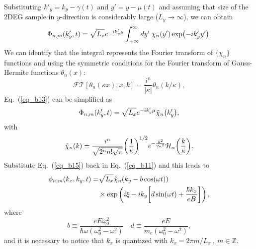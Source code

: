 Substituting $  {k'_y} = k_y -\gamma(t)$ and $y' = y -\mu(t)$ and assuming that size of the 2DEG sample in $y$-direction is considerably large ($L_y \rightarrow \infty$), we can obtain
\begin{equation} \label{eq_b13}
  \Phi_{n,m}({k'_y} ,t) =
  {\sqrt{L_x}} e^{-i {k'_y}\mu}
  \int_{-\infty}^{\infty} dy'\;
  \chi_{n}\qty(y')
  \exp(-i{k'_y} y').
\end{equation}
We can identify that the integral represents the Fourier transform of $\{\chi_n\}$ functions and using the symmetric conditions \cite{celeghini21} for the Fourier transform of Gauss-Hermite functions $\theta_n(x)$:
\begin{equation} \label{eq_b14}
  \mathcal{FT}[\theta_n(\kappa x),x,k] = \frac{i^n}{|\kappa|}\theta_n(k/\kappa),
\end{equation}
Eq.~(\ref{eq_b13}) can be simplified as
\begin{equation} \label{eq_b15}
  \Phi_{n,m}({k'_y} ,t) =
    \sqrt{L_x}e^{-i {k'_y}\mu}
    \tilde{\chi}_{n}\qty({k'_y}),
\end{equation}
with
\begin{equation} \label{eq_b16}
  \tilde{\chi}_{n}\qty(k) =
  \frac{i^n}{\sqrt{2^{n} n! \sqrt{\pi}}}
  \qty(\frac{1}{\kappa})^{1/2}
  e^{-\frac{k^2}{2 \kappa^2}}
  \mathcal{H}_{\alpha} \qty(\frac{k}{\kappa}).
\end{equation}
Substitute Eq.~(\ref{eq_b15}) back in Eq.~(\ref{eq_b11}) and this leads to
\begin{equation} \label{eq_b17}
  \begin{aligned}
    \phi_{n,m}(k_x,k_y,t)  = &
    {\sqrt{L_x}}
    \tilde{\chi}_{n}\qty(k_y - b\cos(\omega t)) \\
    & \times
    \text{exp}\left(
      i\xi
      -ik_y  \qty[d\sin(\omega t) + \frac{\hbar k_x}{eB}]
    \right),
  \end{aligned}
\end{equation}
where
\begin{equation} \label{eq_b18}
  b \equiv
  \frac{eE\omega_0^2}{\hbar\omega(\omega_0^2 - \omega^2)} \quad
  d \equiv
 \frac{eE}{m_e(\omega_0^2 - \omega^2)},
\end{equation}
and it is necessary to notice that $k_x$ is quantized with $k_x = 2\pi m/L_x ~,~ m \in \mathbb{Z}$.
